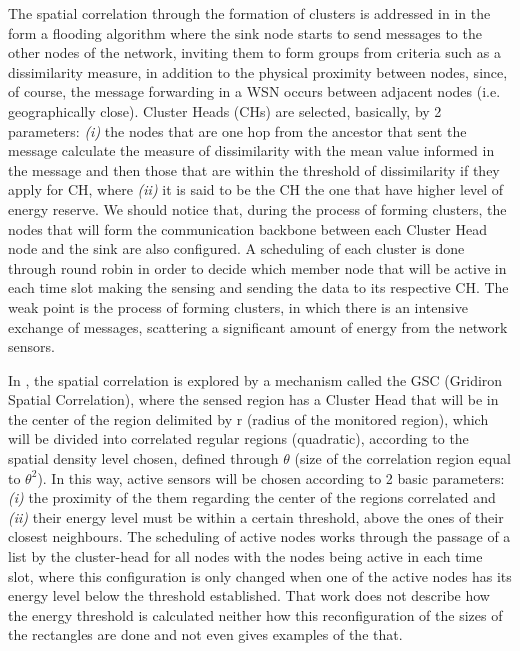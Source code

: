 \documentclass[conference]{IEEEtran}
\begin{document}
The spatial correlation through the formation of clusters is addressed in
\cite{Pham2010} in the form a flooding algorithm where the sink node starts to
send messages to the other nodes of the network, inviting them to form groups
from criteria such as a dissimilarity measure, in addition to the physical
proximity between nodes, since, of course, the message forwarding in a WSN
occurs between adjacent nodes (i.e. geographically close). Cluster Heads (CHs)
are selected, basically, by 2 parameters: {\it (i)} the nodes that are one hop
from the ancestor that sent the message calculate the measure of dissimilarity
with the mean value informed in the message and then those that are within the
threshold of dissimilarity if they apply for CH, where {\it (ii)} it is said to
be the CH the one that have higher level of energy reserve.
We should notice that, during the process of forming clusters, the nodes that
will form the communication backbone between each Cluster Head node and the sink
are also configured. A scheduling of each cluster is done through round robin in
order to decide which member node that will be active in each time slot making
the sensing and sending the data to its respective CH.
The weak point is the process of forming clusters, in
which there is an intensive exchange of messages, scattering a significant
amount of energy from the network sensors.

In \cite{Shah2007}, the spatial correlation is explored by a mechanism called
the GSC (Gridiron Spatial Correlation), where the sensed region has a Cluster
Head that will be in the center of the region delimited by r (radius of the
monitored region), which will be divided into correlated regular regions
(quadratic), according to the spatial density level chosen, defined through
$\theta$ (size of the correlation region equal to $\theta^2$). In this way,
active sensors will be chosen according to 2 basic parameters: {\it (i)} the
proximity of the them regarding the center of the regions correlated and {\it
(ii)} their energy level must be within a certain threshold, above the ones of
their closest neighbours. The scheduling of active nodes works through the
passage of a list by the cluster-head for all nodes with the nodes being active
in each time slot, where this configuration is only changed when one of the
active nodes has its energy level below the threshold established.
That work does not describe how the energy threshold is calculated neither how
this reconfiguration of the sizes of the rectangles are done and not even gives
examples of the that.
\end{document}

